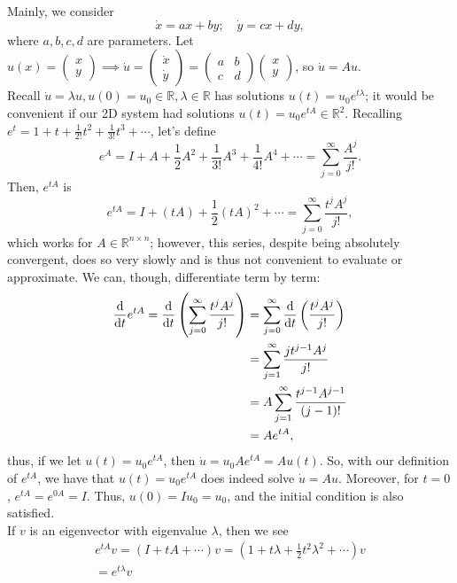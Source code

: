 \documentclass[12pt, oneside]{article}
\begin{document}
Mainly, we consider \[\dot{x} = ax + by; \quad \dot{y} = cx+dy,\] where $a,b,c,d$ are parameters. Let $u(x)=\begin{pmatrix}
  x\\
  y
\end{pmatrix} \implies \dot{u} = \begin{pmatrix}
  \dot{x}\\
  \dot{y}
\end{pmatrix} = \begin{pmatrix}
  a & b\\
  c & d
\end{pmatrix}\begin{pmatrix}
  x\\
  y
\end{pmatrix}$, so $\dot{u} = Au$.\\
Recall $\dot{u} = \lambda u, u(0) = u_0 \in \mathbb{R}, \lambda \in \mathbb{R}$ has solutions $u(t) = u_0e^{t\lambda}$; it would be convenient if our 2D system had solutions $u(t)=u_0e^{tA} \in \mathbb{R}^2$. Recalling $e^t = 1 + t + \frac{1}{2!}t^2 + \frac{1}{3!}t^3 + \cdots$, let's define \[e^A = I + A + \frac{1}{2}A^2 + \frac{1}{3!}A^3 + \frac{1}{4!}A^4 + \cdots = \sum_{j=0}^{\infty} \frac{A^j}{j!}.\]  Then, $e^{tA}$ is \[e^{tA} = I + (tA)+\frac{1}{2}(tA)^2 + \cdots = \sum_{j=0}^\infty \frac{t^j A^j}{j!},\] which works for $A \in \mathbb{R}^{n \times n}$; however, this series, despite being absolutely convergent, does so very slowly and is thus not convenient to evaluate or approximate. We can, though, differentiate term by term:
\begin{align*}
  \dv{t} e^{tA} = \dv{t}\left(\sum_{j=0}^\infty \frac{t^j A^j}{j!}\right) &= \sum_{j=0}^\infty \dv{t}\left(\frac{t^jA^j}{j!}\right)\\
  &= \sum_{j=1}^\infty \frac{jt^{j-1}A^j}{j!}\\
  &= A \sum_{j=1}^\infty \frac{t^{j-1}A^{j-1}}{(j-1)!}\\
  &= A e^{tA},
\end{align*}
thus, if we let $u(t) = u_0e^{t A}$, then $\dot{u} = u_0 Ae^{tA} = Au(t)$. So, with our definition of $e^{tA}$, we have that $u(t)=u_0e^{tA}$ does indeed solve $\dot u = Au$. Moreover, for $t=0$, $e^{tA} = e^{0A} = I$. Thus, $u(0) = Iu_0 = u_0$, and the initial condition is also satisfied.\\
If $v$ is an eigenvector with eigenvalue $\lambda$, then we see \begin{align*}
  e^{tA} v  = (I + t A + \cdots )v = (1 + t \lambda + \frac{1}{2}t^2 \lambda^2 + \cdots )v\\
  = e^{t\lambda} v
\end{align*}
\end{document}
